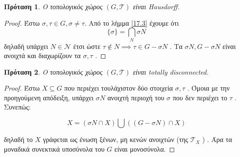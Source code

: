 \documentclass[oneside,a4paper]{article}
\newtheorem{prop}{Πρόταση}
\newcommand {\tl}{\textlatin}
\begin{document}
\begin{prop} Ο τοπολογικός χώρος $(G,\mathcal{T})$ είναι \tl{Hausdorff}.
\end{prop}
\begin{proof}


Έστω $\sigma , \tau \in G, \sigma \neq \tau$.  Από το λήμμα \ref{17.3} έχουμε ότι 
$$\{\sigma \} = \bigcap_N \sigma N$$
δηλαδή υπάρχει $N \in \mathcal{N}$ έτσι ώστε $\tau \notin N \implies \tau \in G-\sigma N$ . Τα $\sigma N , G-\sigma N$ είναι ανοιχτά και διαχωρίζουν τα $\sigma , \tau$ .
\end{proof} 
\begin{prop} Ο τοπολογικός χώρος $(G, \mathcal{T})$ είναι \tl{totally disconnected}.
\end{prop}
\begin{proof} Έστω $X\subseteq G$ που περιέχει τουλάχιστον δύο στοιχεία $\sigma ,\tau$ . Όμοια με την προηγούμενη απόδειξη, υπάρχει $\sigma N$ ανοιχτή περιοχή του $\sigma$ που δεν περιέχει το $\tau$ . Συνεπώς:

$$X = \left( \sigma N \cap X \right) \bigcup \left( \left( G-\sigma N\right) \cap X\right)$$

\noindent δηλαδή το $X$ γράφεται ως ένωση ξένων, μη κενών ανοιχτών (της $\mathcal{T}_X$ ) . Άρα τα μοναδικά συνεκτικά υποσύνολα του $G$ είναι μονοσύνολα.
\end{proof}
\end{document}
